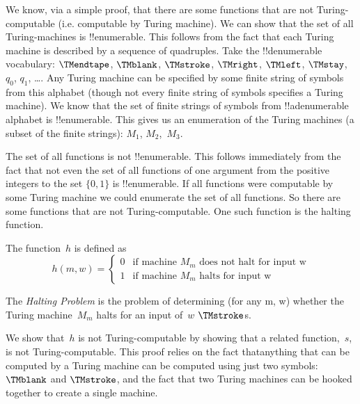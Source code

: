 \documentclass[../../../include/open-logic-section]{subfiles}
\begin{document}

\begin{explain}
We know, via a simple proof, that there are some functions that are not
Turing-computable (i.e. computable by Turing machine).
We can show that the set of all Turing-machines is !!{enumerable}. This
follows from the fact that each Turing machine is described by a sequence
of quadruples. Take the !!{denumerable} vocabulary: $\TMendtape$,
$\TMblank$, $\TMstroke$, $\TMright$, $\TMleft$, $\TMstay$, $q_0$,
$q_1$, \dots. Any Turing machine
can be specified by some finite string of symbols from this alphabet
(though not every finite string of symbols specifies a Turing machine). We
know that the set of finite strings of symbols from !!a{denumerable}
alphabet is !!{enumerable}. This gives us an enumeration of the Turing
machines (a subset of the finite strings): $M_1$, $M_2$,~$M_3$.

The set of all functions is not !!{enumerable}. This follows immediately from
the fact that not even the set of all functions of one argument from the
positive integers to the set $\{0,1\}$ is !!{enumerable}.
If all functions were computable by some Turing machine we could enumerate
the set of all functions. So there are some functions that are not
Turing-computable. One such function is the halting function.
\end{explain}

\begin{defn} The function~$h$ is defined as
\[
h(m,w) =
\begin{cases}
  \text{0} & \text{if machine~$M_m$ does not halt for input w} \\
  \text{1} & \text{if machine~$M_m$ halts for input w}
\end{cases}
\]
\end{defn}

\begin{defn}
The \emph{Halting Problem} is the problem of determining (for any m, w)
whether the Turing machine~$M_m$ halts for an input of~$w$ $\TMstroke$s.
\end{defn}

\begin{explain}
We show that~$h$ is not Turing-computable by showing that a related
function,~$s$, is not Turing-computable. This proof relies on the fact
thatanything that can be computed by a Turing machine can be computed
using just two symbols: $\TMblank$ and $\TMstroke$, and the fact that two
Turing machines can be hooked together to create a single machine.
\end{explain}
\end{document}
